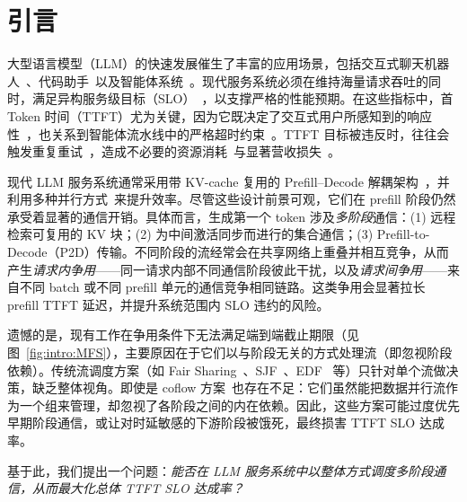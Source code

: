 \section{引言}
大型语言模型（LLM）的快速发展催生了丰富的应用场景，包括交互式聊天机器人~\cite{zheng2023judging,chiang2023vicuna,openai2024gpt4}、代码助手~\cite{liu2024exploring,zhong2024can}以及智能体系统~\cite{talebirad2023multi,he2025llm,yu2024fincon}。现代服务系统必须在维持海量请求吞吐的同时，满足异构服务级目标（SLO）~\cite{tempo2025,patke2024queue,hongsola,chen2025slos,shen2025accelgen}，以支撑严格的性能预期。在这些指标中，首 Token 时间（TTFT）尤为关键，因为它既决定了交互式用户所感知到的响应性~\cite{wang2024revisiting,ethiraj2025toward}，也关系到智能体流水线中的严格超时约束~\cite{LiteLLM,langfuse,notdiamond}。TTFT 目标被违反时，往往会触发重复重试~\cite{Medium1,Medium2}，造成不必要的资源消耗~\cite{mooncake}与显著营收损失~\cite{ranganathan2025enhancing}。



现代 LLM 服务系统通常采用带 KV-cache 复用的 Prefill--Decode 解耦架构~\cite{distserve,splitwise,strati2024d,hu2024inference,mooncakefast,hu2024memserve,cachedattention,cacheblend}，并利用多种并行方式~\cite{expertparallel,deepspeedMoE,deepseektech,comet}来提升效率。尽管这些设计前景可观，它们在 prefill 阶段仍然承受着显著的通信开销。具体而言，生成第一个 token 涉及\emph{多阶段}通信：(1) 远程检索可复用的 KV 块；(2) 为中间激活同步而进行的集合通信；(3) Prefill-to-Decode（P2D）传输。不同阶段的流经常会在共享网络上重叠并相互竞争，从而产生\emph{请求内争用}——同一请求内部不同通信阶段彼此干扰，以及\emph{请求间争用}——来自不同 batch 或不同 prefill 单元的通信竞争相同链路。这类争用会显著拉长 prefill TTFT 延迟，并提升系统范围内 SLO 违约的风险。

遗憾的是，现有工作在争用条件下无法满足端到端截止期限（见图~\ref{fig:intro:MFS}），主要原因在于它们以与阶段无关的方式处理流（即忽视阶段依赖）。传统流调度方案（如 Fair Sharing~\cite{dctcp,dcqcn}、SJF~\cite{pfabric,PDQ,pias,li2024flow}、EDF~\cite{D3,d2tcp,PDQ} 等）只针对单个流做决策，缺乏整体视角。即使是 coflow 方案~\cite{varys,Aalo,zhang2016coda,zhao2015rapier,agarwal2018sincronia,wan2025coflow}也存在不足：它们虽然能把数据并行流作为一个组来管理，却忽视了各阶段之间的内在依赖。因此，这些方案可能过度优先早期阶段通信，或让对时延敏感的下游阶段被饿死，最终损害 TTFT SLO 达成率。

基于此，我们提出一个问题：\emph{能否在 LLM 服务系统中以整体方式调度多阶段通信，从而最大化总体 TTFT SLO 达成率？}

